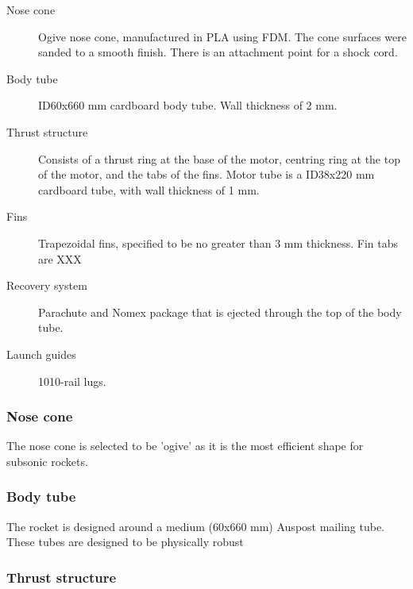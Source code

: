 \documentclass{article}
\begin{document}
            \begin{description}
                \item [Nose cone] Ogive nose cone, manufactured in PLA using FDM. The cone surfaces were sanded to a smooth finish. There is an attachment point for a shock cord.
                \item [Body tube] ID60x660 mm cardboard body tube. Wall thickness of 2 mm.
                \item [Thrust structure] Consists of a thrust ring at the base of the motor, centring ring at the top of the motor, and the tabs of the fins. Motor tube is a ID38x220 mm cardboard tube, with wall thickness of 1 mm. 
                \item [Fins] Trapezoidal fins, specified to be no greater than 3 mm thickness. Fin tabs are XXX
                \item [Recovery system] Parachute and Nomex package that is ejected through the top of the body tube.
                \item [Launch guides] 1010-rail lugs.
            \end{description}

        \subsubsection{Nose cone}
        
            The nose cone is selected to be 'ogive' as it is the most efficient shape for subsonic rockets.
        
        \subsubsection{Body tube}
        
            The rocket is designed around a medium (60x660 mm) Auspost mailing tube. These tubes are designed to be physically robust
        
        \subsubsection{Thrust structure}
        
            
            
\end{document}
